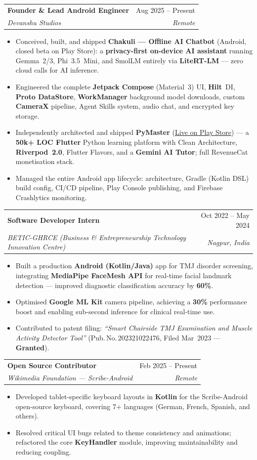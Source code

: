 \documentclass[letterpaper,11pt]{article}
\makeatletter
\newcommand{\pnum}[1]{Pub.\,No.\,#1}
\newcommand{\resumeItem}[1]{\item\small{#1}}
\newcommand{\resumeSubheading}[4]{
  \vspace{-1pt}\item
    \begin{tabular*}{0.97\textwidth}[t]{l@{\extracolsep{\fill}}r}
      \textbf{#1} & \small #2 \\
      \textit{\small #3} & \textit{\small #4} \\
    \end{tabular*}\vspace{-5pt}
}
\newcommand{\resumeItemListStart}{
  \begin{itemize}[leftmargin=0.20in, itemsep=1pt, parsep=0pt, topsep=2pt]
}
\newcommand{\resumeItemListEnd}{\end{itemize}\vspace{2pt}}
\makeatother
\begin{document}
  \resumeSubheading
    {Founder \& Lead Android Engineer}{Aug 2025 -- Present}
    {Devanshu Studios}{Remote}
    \resumeItemListStart
      \resumeItem{Conceived, built, and shipped \textbf{Chakuli — Offline AI Chatbot} (Android, closed beta on Play Store): a \textbf{privacy-first on-device AI assistant} running Gemma~2/3, Phi~3.5~Mini, and SmolLM entirely via \textbf{LiteRT-LM} — zero cloud calls for AI inference.}
      \resumeItem{Engineered the complete \textbf{Jetpack Compose} (Material~3) UI, \textbf{Hilt}~DI, \textbf{Proto DataStore}, \textbf{WorkManager} background model downloads, custom \textbf{CameraX} pipeline, Agent Skills system, audio chat, and encrypted key storage.}
      \resumeItem{Independently architected and shipped \textbf{PyMaster} (\href{https://play.google.com/store/apps/details?id=com.devanshustudios.pymaster}{\underline{Live on Play Store}}) — a \textbf{50k+ LOC Flutter} Python learning platform with Clean Architecture, \textbf{Riverpod~2.0}, Flutter Flavors, and a \textbf{Gemini AI Tutor}; full RevenueCat monetisation stack.}
      \resumeItem{Managed the entire Android app lifecycle: architecture, Gradle (Kotlin DSL) build config, CI/CD pipeline, Play Console publishing, and Firebase Crashlytics monitoring.}
    \resumeItemListEnd

  \resumeSubheading
    {Software Developer Intern}{Oct 2022 -- May 2024}
    {BETIC-GHRCE (Business \& Entrepreneurship Technology Innovation Centre)}{Nagpur, India}
    \resumeItemListStart
      \resumeItem{Built a production \textbf{Android (Kotlin/Java)} app for TMJ disorder screening, integrating \textbf{MediaPipe FaceMesh API} for real-time facial landmark detection — improved diagnostic classification accuracy by \textbf{60\%}.}
      \resumeItem{Optimised \textbf{Google ML Kit} camera pipeline, achieving a \textbf{30\%} performance boost and enabling sub-second inference for clinical real-time use.}
      \resumeItem{Contributed to patent filing: \textit{``Smart Chairside TMJ Examination and Muscle Activity Detector Tool''} (\pnum{202321022476}, Filed Mar~2023 — \textbf{Granted}).}
    \resumeItemListEnd

  \resumeSubheading
    {Open Source Contributor}{Feb 2025 -- Present}
    {Wikimedia Foundation — Scribe-Android}{Remote}
    \resumeItemListStart
      \resumeItem{Developed tablet-specific keyboard layouts in \textbf{Kotlin} for the Scribe-Android open-source keyboard, covering 7+ languages (German, French, Spanish, and others).}
      \resumeItem{Resolved critical UI bugs related to theme consistency and animations; refactored the core \textbf{KeyHandler} module, improving maintainability and reducing coupling.}
    \resumeItemListEnd
\end{document}
